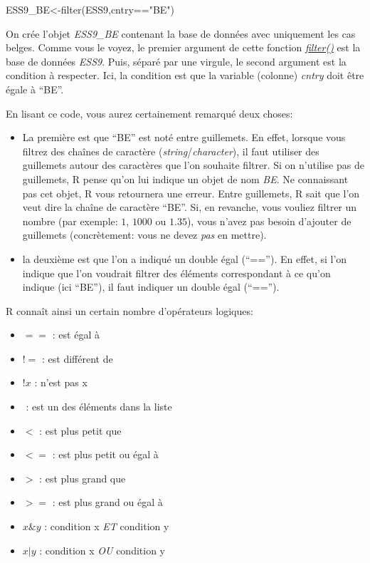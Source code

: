 \documentclass[
]{book}
\newenvironment{Shaded}{\begin{snugshade}}{\end{snugshade}}
\newcommand{\FunctionTok}[1]{\textcolor[rgb]{0.00,0.00,0.00}{#1}}
\newcommand{\NormalTok}[1]{#1}
\newcommand{\OtherTok}[1]{\textcolor[rgb]{0.56,0.35,0.01}{#1}}
\newcommand{\SpecialCharTok}[1]{\textcolor[rgb]{0.00,0.00,0.00}{#1}}
\newcommand{\StringTok}[1]{\textcolor[rgb]{0.31,0.60,0.02}{#1}}
\providecommand{\tightlist}{%
  \setlength{\itemsep}{0pt}\setlength{\parskip}{0pt}}
\begin{document}
\begin{Shaded}
\begin{Highlighting}[]
\NormalTok{ESS9\_BE}\OtherTok{\textless{}{-}}\FunctionTok{filter}\NormalTok{(ESS9,cntry}\SpecialCharTok{==}\StringTok{"BE"}\NormalTok{)}
\end{Highlighting}
\end{Shaded}

On crée l'objet \emph{ESS9\_BE} contenant la base de données avec uniquement les cas belges. Comme vous le voyez, le premier argument de cette fonction \href{https://dplyr.tidyverse.org/reference/filter.html}{\emph{filter()}} est la base de données \emph{ESS9}. Puis, séparé par une virgule, le second argument est la condition à respecter. Ici, la condition est que la variable (colonne) \emph{cntry} doit être égale à ``BE''.

En lisant ce code, vous aurez certainement remarqué deux choses:

\begin{itemize}
\item
  La première est que ``BE'' est noté entre guillemets. En effet, lorsque vous filtrez des chaînes de caractère (\emph{string}/\emph{character}), il faut utiliser des guillemets autour des caractères que l'on souhaite filtrer. Si on n'utilise pas de guillemets, R pense qu'on lui indique un objet de nom \emph{BE}. Ne connaissant pas cet objet, R vous retournera une erreur. Entre guillemets, R sait que l'on veut dire la chaîne de caractère ``BE''. Si, en revanche, vous vouliez filtrer un nombre (par exemple: \(1\), \(1000\) ou \(1.35\)), vous n'avez pas besoin d'ajouter de guillemets (concrètement: vous ne devez \emph{pas} en mettre).
\item
  la deuxième est que l'on a indiqué un double égal (``==''). En effet, si l'on indique que l'on voudrait filtrer des éléments correspondant à ce qu'on indique (ici ``BE''), il faut indiquer un double égal (``=='').
\end{itemize}

R connaît ainsi un certain nombre d'opérateurs logiques:

\begin{itemize}
\tightlist
\item
  \(==\) : est égal à
\item
  \(!=\) : est différent de
\item
  \(!x\) : n'est pas x
\item
  \(%
  \) : est un des éléments dans la liste
\item
  \(<\) : est plus petit que
\item
  \(<=\) : est plus petit ou égal à
\item
  \(>\) : est plus grand que
\item
  \(>=\) : est plus grand ou égal à
\item
  \(x \& y\) : condition x \emph{ET} condition y
\item
  \(x | y\) : condition x \emph{OU} condition y
\end{itemize}
\end{document}
